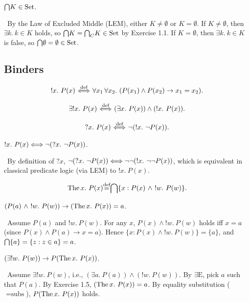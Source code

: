 \documentclass[10pt,a4paper]{article}
\begin{document}
\begin{exercise}
${\bigcap} K \in {\textrm{Set}}$.
\end{exercise}
\myprf\ By the Law of Excluded Middle (LEM), either $K \neq \emptyset$ or $K = \emptyset$. If $K \neq \emptyset$, then $\exists k.\ k \in K$ holds, so ${\bigcap} K = {{\bigcap}_C} K \in {\textrm{Set}}$ by Exercise 1.1. If $K = \emptyset$, then $\exists k.\ k \in K$ is false, so ${\bigcap} \emptyset = \emptyset \in {\textrm{Set}}$. \myqed

\subsection{Binders}
\begin{definition}
$$!x.\ P(x) {\stackrel{{\textrm{def}}}{\ \Longleftrightarrow\ }} \forall x_1\, \forall x_2.\ (P(x_1)\land P(x_2)\to x_1=x_2).$$
\end{definition}

\begin{definition}
$$\exists !x.\ P(x) \propdef (\exists x.\ P(x))\land(!x.\ P(x)).$$
\end{definition}

\begin{definition}
$$?x.\ P(x) {\stackrel{{\textrm{def}}}{\ \Longleftrightarrow\ }} \neg (!x.\ \neg P(x)).$$
\end{definition}

\begin{exercise}
$!x.\ P(x) \Longleftrightarrow \neg (?x.\ \neg P(x))$.
\end{exercise}
\myprf\ By definition of $?x$, $\neg (?x.\ \neg P(x)) \LRA \neg \neg (!x.\ \neg \neg P(x))$, which is equivalent in classical predicate logic (via LEM) to $!x.\ P(x)$. \myqed

\begin{definition}
$$\The x.\ P(x) \eqdef \inter \{x : P(x)\ \land\ !w.\ P(w)\}.$$
\end{definition}

\begin{exercise}
$(P(a)\ \land\ !w.\ P(w)) \to (\The x.\ P(x))=a$.
\end{exercise}
\myprf\ Assume $P(a)$ and $!w.\ P(w)$. For any $x$, $P(x) \land !w.\ P(w)$ holds iff $x = a$ (since $P(x) \land P(a) \to x=a$). Hence $\{x : P(x) \land !w.\ P(w)\} = \{a\}$, and ${\bigcap} \{a\} = \{z : z \in a\} = a$. \myqed

\begin{exercise}
$(\exists !w.\ P(w)) \to P(\The x.\ P(x))$.
\end{exercise}
\myprf\ Assume $\exists !w.\ P(w)$, i.e., $(\exists a.\ P(a)) \land (!w.\ P(w))$. By $\exists\textrm{E}$, pick $a$ such that $P(a)$. By Exercise 1.5, $({\textrm{The\,}} x.\ P(x)) = a$. By equality substitution ($=\textrm{subs}$), $P({\textrm{The\,}} x.\ P(x))$ holds. \myqed
\end{document}
